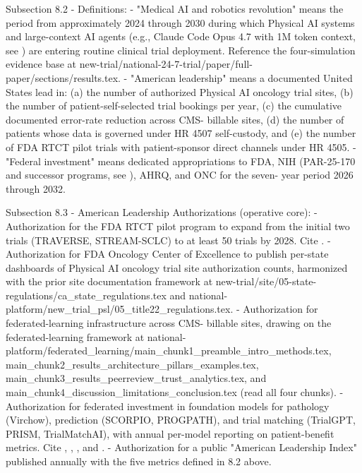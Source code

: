 Subsection 8.2 - Definitions:
- "Medical AI and robotics revolution" means the period from
  approximately 2024 through 2030 during which Physical AI systems
  and large-context AI agents (e.g., Claude Code Opus 4.7 with 1M
  token context, see \cite{claude_opus_47}) are entering routine
  clinical trial deployment. Reference the four-simulation evidence
  base at new-trial/national-24-7-trial/paper/full-paper/sections/results.tex.
- "American leadership" means a documented United States lead in:
  (a) the number of authorized Physical AI oncology trial sites,
  (b) the number of patient-self-selected trial bookings per year,
  (c) the cumulative documented error-rate reduction across CMS-
  billable sites, (d) the number of patients whose data is governed
  under HR 4507 self-custody, and (e) the number of FDA RTCT pilot
  trials with patient-sponsor direct channels under HR 4505.
- "Federal investment" means dedicated appropriations to FDA, NIH
  (PAR-25-170 and successor programs, see
  \cite{nih_par25_170_dht_endpoints}), AHRQ, and ONC for the seven-
  year period 2026 through 2032.

Subsection 8.3 - American Leadership Authorizations (operative core):
- Authorization for the FDA RTCT pilot program to expand from the
  initial two trials (TRAVERSE, STREAM-SCLC) to at least 50 trials
  by 2028. Cite \cite{fda_rtct_press_2026}.
- Authorization for FDA Oncology Center of Excellence to publish
  per-state dashboards of Physical AI oncology trial site
  authorization counts, harmonized with the prior site
  documentation framework at
  new-trial/site/05-state-regulations/ca\_state\_regulations.tex and
  national-platform/new\_trial\_psl/05\_title22\_regulations.tex.
- Authorization for federated-learning infrastructure across CMS-
  billable sites, drawing on the federated-learning framework at
  national-platform/federated\_learning/main\_chunk1\_preamble\_intro\_methods.tex,
  main\_chunk2\_results\_architecture\_pillars\_examples.tex,
  main\_chunk3\_results\_peerreview\_trust\_analytics.tex, and
  main\_chunk4\_discussion\_limitations\_conclusion.tex (read all four
  chunks).
- Authorization for federated investment in foundation models for
  pathology (Virchow), prediction (SCORPIO, PROGPATH), and trial
  matching (TrialGPT, PRISM, TrialMatchAI), with annual per-model
  reporting on patient-benefit metrics. Cite
  \cite{vorontsov2024virchow}, \cite{jin2024trialgpt},
  \cite{gupta2024prism}, and \cite{abdallah2026trialmatchai}.
- Authorization for a public "American Leadership Index" published
  annually with the five metrics defined in 8.2 above.

